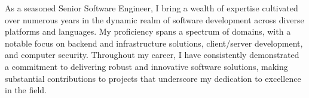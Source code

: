 \begin{cvparagraph}

As a seasoned Senior Software Engineer, I bring a wealth of expertise cultivated over numerous years in the dynamic realm of software development across diverse platforms and languages. My proficiency spans a spectrum of domains, with a notable focus on backend and infrastructure solutions, client/server development, and computer security. Throughout my career, I have consistently demonstrated a commitment to delivering robust and innovative software solutions, making substantial contributions to projects that underscore my dedication to excellence in the field.
\end{cvparagraph}
